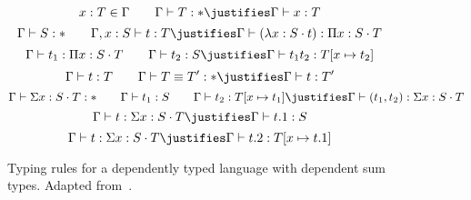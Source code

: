 \begin{figure}
    \begin{proofrules}
        \[ x : T \in \context{\Gamma} \qquad \Gamma \vdash T : *
        \justifies
        \context{\Gamma} \vdash x : T 
        \]
        \[ \Gamma \vdash S : * \qquad \Gamma, x : S \vdash t : T 
        \justifies 
        \Gamma \vdash (\lambda x : S \cdot t) : \Pi x : S \cdot T 
        \]
        \[ \Gamma \vdash t_1 : \Pi x : S \cdot T \qquad \Gamma \vdash t_2 : S 
        \justifies 
        \Gamma \vdash t_1 t_2 : T[x \mapsto t_2] 
        \]
        \[ \Gamma \vdash t : T \qquad \Gamma \vdash T \equiv T^\prime : * 
        \justifies 
        \Gamma \vdash t : T^\prime 
        \]
        \[ \Gamma \vdash \Sigma x : S \cdot T : * \qquad 
            \Gamma \vdash t_1 : S \qquad  \Gamma \vdash t_2 : T[x \mapsto t_1] 
        \justifies 
        \Gamma \vdash (t_1, t_2) : \Sigma x : S \cdot T 
        \] 
        \[ \Gamma \vdash t : \Sigma x : S \cdot T 
        \justifies 
        \Gamma \vdash t.1 : S 
        \]
        \[ \Gamma \vdash t : \Sigma x : S \cdot T 
        \justifies 
        \Gamma \vdash t.2 : T[x \mapsto t.1] 
        \]
    \end{proofrules}
\caption{Typing rules for a dependently typed language with dependent sum types. Adapted from~\cite{pierce2005advanced}.}
\label{fig:dtt-w-sigma}
\end{figure}